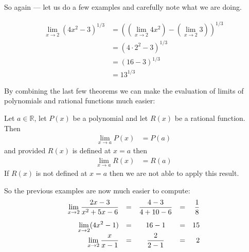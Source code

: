 So again --- let us do a few examples and carefully note what we are doing.
\begin{eg}
\begin{align*}
  \lim_{x \to 2} (4x^2-3)^{1/3} &=
  \left( (\lim_{x\to 2} 4x^2) - (\lim_{x \to 2} 3) \right)^{1/3} \\
  &= \left( 4 \cdot 2^2  - 3 \right)^{1/3}\\
  &= \left( 16-3 \right)^{1/3} \\
  &= 13^{1/3}
\end{align*}
\end{eg}

By combining the last few theorems we can make the evaluation of limits of
polynomials and rational functions much easier:
\begin{theorem}
Let $a \in \mathbb{R}$, let $P(x)$ be a polynomial and let $R(x)$ be a rational
function. Then
\begin{align*}
  \lim_{x \to a} P(x) &= P(a)
\end{align*}
and provided $R(x)$ is defined at $x=a$ then
\begin{align*}
  \lim_{x \to a} R(x) &= R(a)
\end{align*}
If $R(x)$ is not defined at $x=a$ then we are not able to apply this result.
\end{theorem}
So the previous examples are now much easier to compute:
\begin{align*}
\begin{array}{rcccr}
  \displaystyle\lim_{x \to 2} \frac{2x-3}{x^2+5x-6} &=& \displaystyle \frac{4-3}{4+10-6} &=&
\displaystyle \frac{1}{8}\\[3ex]
  \displaystyle\lim_{x\to 2} (4x^2-1) &=& 16-1 &=& 15 \\[1ex]
  \displaystyle\lim_{x\to 2} \frac{x}{x-1} &=& \displaystyle \frac{2}{2-1} &=& 2
\end{array}
\end{align*}


